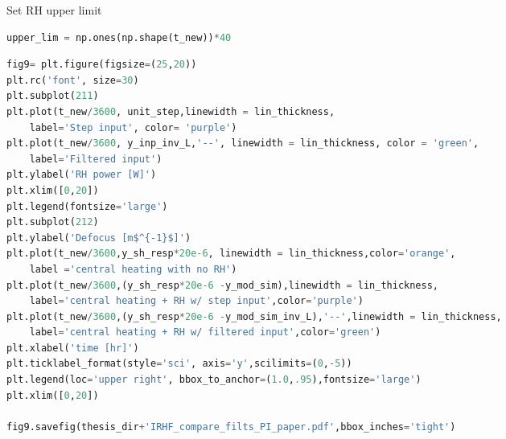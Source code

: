 
\noindent Set RH upper limit

\begin{spacing}{1.2} \begin{lstlisting}[frame=single,language=Python]
upper_lim = np.ones(np.shape(t_new))*40
\end{lstlisting} \end{spacing}

\begin{spacing}{1.2} \begin{lstlisting}[frame=single,language=Python]
fig9= plt.figure(figsize=(25,20))
plt.rc('font', size=30)
plt.subplot(211)
plt.plot(t_new/3600, unit_step,linewidth = lin_thickness,
    label='Step input', color= 'purple')
plt.plot(t_new/3600, y_inp_inv_L,'--', linewidth = lin_thickness, color = 'green',
    label='Filtered input')
plt.ylabel('RH power [W]')
plt.xlim([0,20])
plt.legend(fontsize='large')
plt.subplot(212)
plt.ylabel('Defocus [m$^{-1}$]')
plt.plot(t_new/3600,y_sh_resp*20e-6, linewidth = lin_thickness,color='orange',
    label ='central heating with no RH')
plt.plot(t_new/3600,(y_sh_resp*20e-6 -y_mod_sim),linewidth = lin_thickness,
    label='central heating + RH w/ step input',color='purple')
plt.plot(t_new/3600,(y_sh_resp*20e-6 -y_mod_sim_inv_L),'--',linewidth = lin_thickness,
    label='central heating + RH w/ filtered input',color='green')
plt.xlabel('time [hr]')
plt.ticklabel_format(style='sci', axis='y',scilimits=(0,-5))
plt.legend(loc='upper right', bbox_to_anchor=(1.0,.95),fontsize='large')
plt.xlim([0,20])

fig9.savefig(thesis_dir+'IRHF_compare_filts_PI_paper.pdf',bbox_inches='tight')
\end{lstlisting} \end{spacing}


